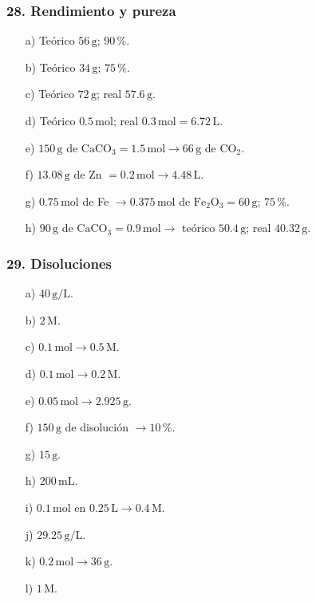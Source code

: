 \subsubsection*{28. Rendimiento y pureza}
\begin{enumerate}
    \item[a)] Teórico $56\,\mathrm{g}$; $90\,\%$.

    \item[b)] Teórico $34\,\mathrm{g}$; $75\,\%$.

    \item[c)] Teórico $72\,\mathrm{g}$; real $57.6\,\mathrm{g}$.

    \item[d)] Teórico $0.5\,\mathrm{mol}$;
    real $0.3\,\mathrm{mol}=6.72\,\mathrm{L}$.

    \item[e)] $150\,\mathrm{g}$ de $\mathrm{CaCO_3}
    =1.5\,\mathrm{mol}\rightarrow66\,\mathrm{g}$ de $\mathrm{CO_2}$.

    \item[f)] $13.08\,\mathrm{g}$ de Zn $=0.2\,\mathrm{mol}
    \rightarrow4.48\,\mathrm{L}$.

    \item[g)] $0.75\,\mathrm{mol}$ de Fe $\rightarrow
    0.375\,\mathrm{mol}$ de $\mathrm{Fe_2O_3}=60\,\mathrm{g}$;
    $75\,\%$.

    \item[h)] $90\,\mathrm{g}$ de $\mathrm{CaCO_3}
    =0.9\,\mathrm{mol}\rightarrow$
    teórico $50.4\,\mathrm{g}$; real $40.32\,\mathrm{g}$.
\end{enumerate}

\subsubsection*{29. Disoluciones}
\begin{enumerate}
    \item[a)] $40\,\mathrm{g/L}$.
    \item[b)] $2\,\mathrm{M}$.
    \item[c)] $0.1\,\mathrm{mol}\rightarrow0.5\,\mathrm{M}$.
    \item[d)] $0.1\,\mathrm{mol}\rightarrow0.2\,\mathrm{M}$.
    \item[e)] $0.05\,\mathrm{mol}\rightarrow2.925\,\mathrm{g}$.
    \item[f)] $150\,\mathrm{g}$ de disolución $\rightarrow10\,\%$.
    \item[g)] $15\,\mathrm{g}$.
    \item[h)] $200\,\mathrm{mL}$.
    \item[i)] $0.1\,\mathrm{mol}$ en $0.25\,\mathrm{L}\rightarrow0.4\,\mathrm{M}$.
    \item[j)] $29.25\,\mathrm{g/L}$.
    \item[k)] $0.2\,\mathrm{mol}\rightarrow36\,\mathrm{g}$.
    \item[l)] $1\,\mathrm{M}$.
\end{enumerate}

